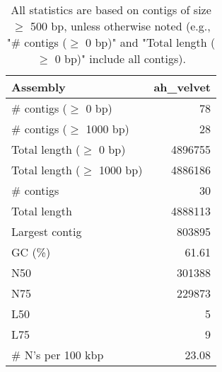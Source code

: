 \documentclass[12pt,a4paper]{article}
\begin{document}
\begin{table}[ht]
\begin{center}
\caption{All statistics are based on contigs of size $\geq$ 500 bp, unless otherwise noted (e.g., "\# contigs ($\geq$ 0 bp)" and "Total length ($\geq$ 0 bp)" include all contigs).}
\begin{tabular}{|l*{1}{|r}|}
\hline
Assembly & ah\_velvet \\ \hline
\# contigs ($\geq$ 0 bp) & 78 \\ \hline
\# contigs ($\geq$ 1000 bp) & 28 \\ \hline
Total length ($\geq$ 0 bp) & 4896755 \\ \hline
Total length ($\geq$ 1000 bp) & 4886186 \\ \hline
\# contigs & 30 \\ \hline
Total length & 4888113 \\ \hline
Largest contig & 803895 \\ \hline
GC (\%) & 61.61 \\ \hline
N50 & 301388 \\ \hline
N75 & 229873 \\ \hline
L50 & 5 \\ \hline
L75 & 9 \\ \hline
\# N's per 100 kbp & 23.08 \\ \hline
\end{tabular}
\end{center}
\end{table}
\end{document}
